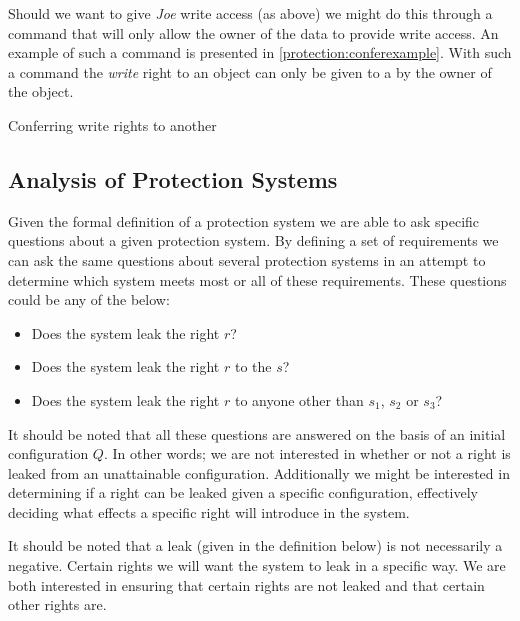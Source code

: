 Should we want to give \textit{Joe} write access (as above) we might do this through a command that will only allow the owner of the data to provide write access.
An example of such a command is presented in \cref{protection:conferexample}.
With such a command the \textit{write} right to an object can only be given to a \ssubject{} by the owner of the object.

\begin{algorithm}
  \DontPrintSemicolon
  \cmd {} 
  \caption{Conferring write rights to another \ssubject{} \cite{HRU}\label{protection:conferexample}}
\end{algorithm}

\subsection{Analysis of Protection Systems}
Given the formal definition of a protection system we are able to ask specific questions about a given protection system.
By defining a set of requirements we can ask the same questions about several protection systems in an attempt to determine which system meets most or all of these requirements.
These questions could be any of the below:
\begin{itemize}
\item Does the system leak the right $r$?
\item Does the system leak the right $r$ to the \ssubject{} $s$?
\item Does the system leak the right $r$ to anyone other than \ssubject{} $s_1$, $s_2$ or $s_3$?
\end{itemize}
It should be noted that all these questions are answered on the basis of an initial configuration $Q$.
In other words; we are not interested in whether or not a right is leaked from an unattainable configuration.
Additionally we might be interested in determining if a right can be leaked given a specific configuration, effectively deciding what effects a specific right will introduce in the system.

It should be noted that a leak (given in the definition below) is not necessarily a negative.
Certain rights we will want the system to leak in a specific way.
We are both interested in ensuring that certain rights are not leaked and that certain other rights are.

